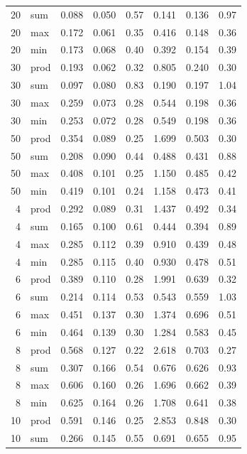 \documentclass[11pt]{article}
\begin{document}
\begin{table}[H]
\begin{tabular}{@{}rlrrrrrr@{}}
        20 & sum & 0.088 & 0.050 & 0.57 & 0.141 & 0.136 & 0.97 \\
        20 & max & 0.172 & 0.061 & 0.35 & 0.416 & 0.148 & 0.36 \\
        20 & min & 0.173 & 0.068 & 0.40 & 0.392 & 0.154 & 0.39 \\
        30 & prod & 0.193 & 0.062 & 0.32 & 0.805 & 0.240 & 0.30 \\
        30 & sum & 0.097 & 0.080 & 0.83 & 0.190 & 0.197 & 1.04 \\
        30 & max & 0.259 & 0.073 & 0.28 & 0.544 & 0.198 & 0.36 \\
        30 & min & 0.253 & 0.072 & 0.28 & 0.549 & 0.198 & 0.36 \\
        50 & prod & 0.354 & 0.089 & 0.25 & 1.699 & 0.503 & 0.30 \\
        50 & sum & 0.208 & 0.090 & 0.44 & 0.488 & 0.431 & 0.88 \\
        50 & max & 0.408 & 0.101 & 0.25 & 1.150 & 0.485 & 0.42 \\
        50 & min & 0.419 & 0.101 & 0.24 & 1.158 & 0.473 & 0.41 \\
        4 & prod & 0.292 & 0.089 & 0.31 & 1.437 & 0.492 & 0.34 \\
        4 & sum & 0.165 & 0.100 & 0.61 & 0.444 & 0.394 & 0.89 \\
        4 & max & 0.285 & 0.112 & 0.39 & 0.910 & 0.439 & 0.48 \\
        4 & min & 0.285 & 0.115 & 0.40 & 0.930 & 0.478 & 0.51 \\
        6 & prod & 0.389 & 0.110 & 0.28 & 1.991 & 0.639 & 0.32 \\
        6 & sum & 0.214 & 0.114 & 0.53 & 0.543 & 0.559 & 1.03 \\
        6 & max & 0.451 & 0.137 & 0.30 & 1.374 & 0.696 & 0.51 \\
        6 & min & 0.464 & 0.139 & 0.30 & 1.284 & 0.583 & 0.45 \\
        8 & prod & 0.568 & 0.127 & 0.22 & 2.618 & 0.703 & 0.27 \\
        8 & sum & 0.307 & 0.166 & 0.54 & 0.676 & 0.626 & 0.93 \\
        8 & max & 0.606 & 0.160 & 0.26 & 1.696 & 0.662 & 0.39 \\
        8 & min & 0.625 & 0.164 & 0.26 & 1.708 & 0.641 & 0.38 \\
        10 & prod & 0.591 & 0.146 & 0.25 & 2.853 & 0.848 & 0.30 \\
        10 & sum & 0.266 & 0.145 & 0.55 & 0.691 & 0.655 & 0.95 \\

\end{tabular}
\end{table}
\end{document}

